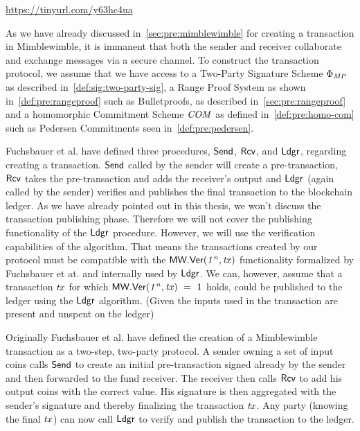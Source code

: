 \urldef\urlgrinexplained\url{https://tinyurl.com/y63hc4ua}

As we have already discussed in~\cref{sec:pre:mimblewimble} for creating a transaction in Mimblewimble, it is immanent that both the sender and receiver collaborate and exchange messages via a secure channel.
To construct the transaction protocol, we assume that we have access to a Two-Party Signature Scheme $\Phi_{\mathit{MP}}$ as described in~\cref{def:sig:two-party-sig}, a Range Proof System as shown in~\cref{def:pre:rangeproof} such as Bulletproofs, as described in~\cref{sec:pre:rangeproof} and a homomorphic Commitment Scheme $\mathit{COM}$ as defined in~\cref{def:pre:homo-com} such as Pedersen Commitments seen in~\cref{def:pre:pedersen}.

Fuchsbauer et al. have defined three procedures, $\mathsf{Send}$, $\mathsf{Rcv}$, and $\mathsf{Ldgr}$, regarding creating a transaction.
$\mathsf{Send}$ called by the sender will create a pre-transaction, $\mathsf{Rcv}$ takes the pre-transaction and adds the receiver's output and $\mathsf{Ldgr}$ (again called by the sender) verifies and publishes the final transaction to the blockchain ledger.
As we have already pointed out in this thesis, we won't discuss the transaction publishing phase.
Therefore we will not cover the publishing functionality of the $\mathsf{Ldgr}$ procedure.
However, we will use the verification capabilities of the algorithm.
That means the transactions created by our protocol must be compatible with the $\mathsf{MW.Ver(\mathit{1^n}, \mathit{tx})}$ functionality formalized by Fuchsbauer et at. and internally used by $\mathsf{Ldgr}$.
We can, however, assume that a transaction $\mathit{tx}$ for which $\mathsf{MW.Ver(\mathit{1^n}, \mathit{tx})} ~=~ 1$ holds, could be published to the ledger using the $\mathsf{Ldgr}$ algorithm. (Given the inputs used in the transaction are present and unspent on the ledger)

Originally Fuchsbauer et al. have defined the creation of a Mimblewimble transaction as a two-step, two-party protocol.
A sender owning a set of input coins calls $\mathsf{Send}$ to create an initial pre-transaction signed already by the sender and then forwarded to the fund receiver.
The receiver then calls $\mathsf{Rcv}$ to add his output coins with the correct value.
His signature is then aggregated with the sender's signature and thereby finalizing the transaction $\mathit{tx}$.
Any party (knowing the final $\mathit{tx}$) can now call $\mathsf{Ldgr}$ to verify and publish the transaction to the ledger.

